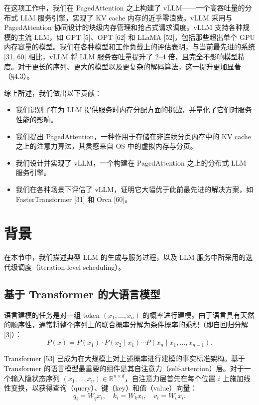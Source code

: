 \documentclass[11pt,UTF8,fontset=fandol]{ctexart}
\begin{document}
在这项工作中，我们在 PagedAttention 之上构建了 vLLM——一个高吞吐量的分布式 LLM 服务引擎，实现了 KV cache 内存的近乎零浪费。vLLM 采用与 PagedAttention 协同设计的块级内存管理和抢占式请求调度。vLLM 支持各种规模的主流 LLM，如 GPT [5]、OPT [62] 和 LLaMA [52]，包括那些超出单个 GPU 内存容量的模型。我们在各种模型和工作负载上的评估表明，与当前最先进的系统 [31, 60] 相比，vLLM 将 LLM 服务吞吐量提升了 2--4 倍，且完全不影响模型精度。对于更长的序列、更大的模型以及更复杂的解码算法，这一提升更加显著（\S4.3）。

综上所述，我们做出以下贡献：

\begin{itemize}[leftmargin=2em]
\item 我们识别了在为 LLM 提供服务时内存分配方面的挑战，并量化了它们对服务性能的影响。
\item 我们提出 PagedAttention，一种作用于存储在非连续分页内存中的 KV cache 之上的注意力算法，其灵感来自 OS 中的虚拟内存与分页。
\item 我们设计并实现了 vLLM，一个构建在 PagedAttention 之上的分布式 LLM 服务引擎。
\item 我们在各种场景下评估了 vLLM，证明它大幅优于此前最先进的解决方案，如 FasterTransformer [31] 和 Orca [60]。
\end{itemize}

\section{背景}

在本节中，我们描述典型 LLM 的生成与服务过程，以及 LLM 服务中所采用的迭代级调度（iteration-level scheduling）。

\subsection{基于 Transformer 的大语言模型}

语言建模的任务是对一组 token $(x_1, \ldots, x_n)$ 的概率进行建模。由于语言具有天然的顺序性，通常将整个序列上的联合概率分解为条件概率的乘积（即自回归分解 [3]）：
\begin{equation}
P(x) = P(x_1) \cdot P(x_2 \mid x_1) \cdots P(x_n \mid x_1, \ldots, x_{n-1}). \tag{1}
\end{equation}

Transformer [53] 已成为在大规模上对上述概率进行建模的事实标准架构。基于 Transformer 的语言模型最重要的组件是其自注意力（self-attention）层。对于一个输入隐状态序列 $(x_1, \ldots, x_n) \in \mathbb{R}^{n \times d}$，自注意力层首先在每个位置 $i$ 上施加线性变换，以获得查询（query）、键（key）和值（value）向量：
\begin{equation}
q_i = W_q x_i, \quad k_i = W_k x_i, \quad v_i = W_v x_i. \tag{2}
\end{equation}
\end{document}
